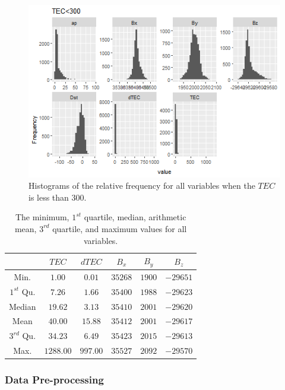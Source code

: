 \documentclass[preprint,12pt]{elsarticle}
\begin{document}
\begin{figure}
 \centering
 \includegraphics[width=0.9\linewidth]{300TEC_fix.png}
    \caption{Histograms of the relative frequency for all variables when the $TEC$ is less than $300$.}
    \label{fig:300TEC}
\end{figure}

\begin{table}[!ht]
    \centering
    \begin{tabular}{|c|c|c|c|c|c|}
        \hline
        & $TEC$ & $dTEC$ & $B_{x}$ & $B_{y}$ & $B_{z}$ \\ \hline
        Min. & $1.00$ & $0.01$ & $35268$ & $1900$ & $-29651$ \\ \hline
        $1^{st}$ Qu. & $7.26$ & $1.66$ & $35400$ & $1988$ & $-29623$ \\ \hline
        Median & $19.62$ & $3.13$ & $35410$ & $2001$ & $-29620$ \\ \hline
        Mean & $40.00$ & $15.88$ & $35412$ & $2001$ & $-29617$ \\ \hline
        $3^{rd}$ Qu. & $34.23$ & $6.49$ & $35423$ & $2015$ & $-29613$ \\ \hline
        Max. & $1288.00$ & $997.00$ & $35527$ & $2092$ & $-29570$ \\ \hline
    \end{tabular}
    \caption{The minimum, $1^{st}$ quartile, median, arithmetic mean, $3^{rd}$ quartile, and maximum values for all variables.}
    \label{tab:my_label}
\end{table}

\subsubsection{Data Pre-processing}
\end{document}
